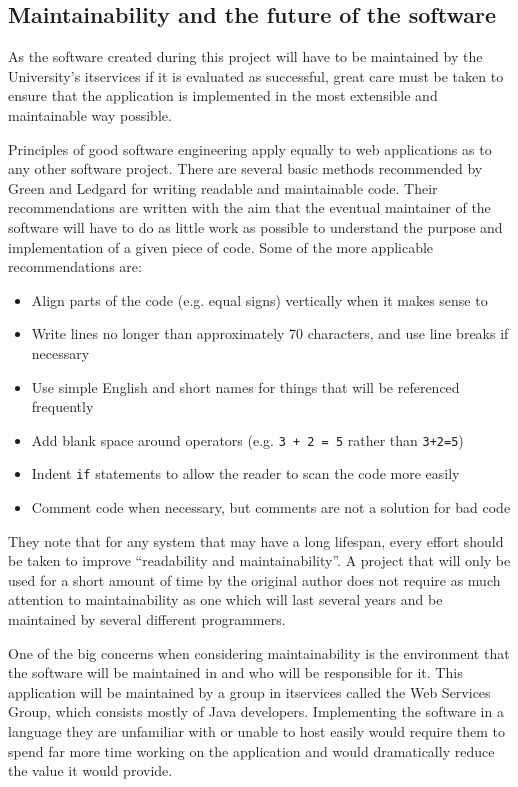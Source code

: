 
\subsection{Maintainability and the future of the software}
\label{sec:maintainability}

As the software created during this project will have to be maintained by the
University's \gls{itservices} if it is evaluated as successful, great care
must be taken to ensure that the application is implemented in the most
extensible and maintainable way possible.

Principles of good software engineering apply equally to web applications as
to any other software project. There are several basic methods recommended by
Green and Ledgard \cite{CodingGuidelines_2011} for writing readable and
maintainable code. Their recommendations are written with the aim that the
eventual maintainer of the software will have to do as little work as possible
to understand the purpose and implementation of a given piece of code. Some of
the more applicable recommendations are:

\begin{itemize}
  \item Align parts of the code (e.g. equal signs)
        vertically when it makes sense to
  \item Write lines no longer than approximately 70 characters,
        and use line breaks if necessary
  \item Use simple English and short names for things that will
        be referenced frequently
  \item Add blank space around operators (e.g. \texttt{3 + 2 = 5}
        rather than \texttt{3+2=5})
  \item Indent \texttt{if} statements to allow the reader to scan
        the code more easily
  \item Comment code when necessary, but comments are not a
        solution for bad code
\end{itemize}

They note that for any system that may have a long lifespan, every effort
should be taken to improve ``readability and maintainability''. A project that
will only be used for a short amount of time by the original author does not
require as much attention to maintainability as one which will last several
years and be maintained by several different programmers.

One of the big concerns when considering maintainability is the environment
that the software will be maintained in and who will be responsible for it.
This application will be maintained by a group in \gls{itservices} called the
Web Services Group, which consists mostly of Java developers. Implementing the
software in a language they are unfamiliar with or unable to host easily would
require them to spend far more time working on the application and would
dramatically reduce the value it would provide.
